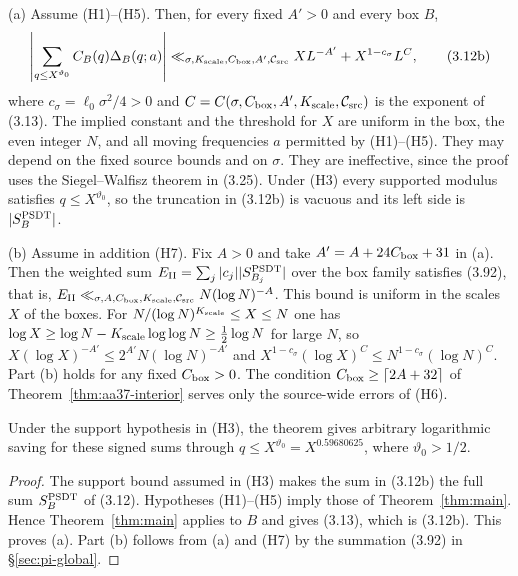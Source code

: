 \begin{theorem}\label{thm:standalone}
\textup{(a)} Assume (H1)--(H5). Then, for every fixed $A'>0$ and
every box $B$,
\[
 \left|\sum_{q\le X^{\vartheta_0}}C_B(q)\Delta_B(q;a)\right|
 \ll_{\sigma,K_{\rm scale},C_{\rm box},A',\mathcal C_{\rm src}}
 XL^{-A'}+X^{1-c_\sigma}L^C,
\tag{3.12b}
\]
where $c_\sigma=\ell_0\sigma^2/4>0$ and
$C=C(\sigma,C_{\rm box},A',K_{\rm scale},\mathcal C_{\rm src})$ is the exponent of (3.13).
The implied constant and the threshold for $X$ are uniform in the box,
the even integer $N$, and all moving frequencies $a$ permitted by
(H1)--(H5). They may
depend on the fixed source bounds and on $\sigma$. They are
ineffective, since the proof uses the Siegel--Walfisz theorem in (3.25).
Under (H3) every supported modulus satisfies $q\le X^{\vartheta_0}$, so
the truncation in (3.12b) is vacuous and its left side is $|S_B^{\rm PSDT}|$.

\textup{(b)} Assume in addition (H7). Fix $A>0$ and take
$A'=A+24C_{\rm box}+31$ in \textup{(a)}. Then the weighted sum
$E_{\rm II}=\sum_j|c_j||S_{B_j}^{\rm PSDT}|$ over the box family
satisfies (3.92), that is,
$E_{\rm II}\ll_{\sigma,A,C_{\rm box},K_{\rm scale},\mathcal C_{\rm src}}
N(\log N)^{-A}$.
This bound is uniform in the scales $X$ of the boxes. For
$N/(\log N)^{K_{\rm scale}}\le X\le N$ one has
$\log X\ge\log N-K_{\rm scale}\log\log N\ge\tfrac12\log N$ for large $N$,
so $X(\log X)^{-A'}\le2^{A'}N(\log N)^{-A'}$ and
$X^{1-c_\sigma}(\log X)^C\le N^{1-c_\sigma}(\log N)^C$.
Part \textup{(b)} holds for any fixed $C_{\rm box}>0$. The condition
$C_{\rm box}\ge\lceil2A+32\rceil$ of Theorem~\ref{thm:aa37-interior}
serves only the source-wide errors of (H6).

Under the support hypothesis in (H3), the theorem gives arbitrary
logarithmic saving for these signed sums through
$q\le X^{\vartheta_0}=X^{0.59680625}$, where $\vartheta_0>1/2$.
\end{theorem}

\begin{proof}
The support bound assumed in (H3) makes the sum in (3.12b)
the full sum $S_B^{\rm PSDT}$ of (3.12).
Hypotheses (H1)--(H5) imply those of Theorem~\ref{thm:main}.
Hence Theorem~\ref{thm:main} applies to $B$ and gives (3.13), which is (3.12b).
This proves \textup{(a)}. Part \textup{(b)} follows from \textup{(a)}
and (H7) by the summation (3.92) in \S\ref{sec:pi-global}.
\end{proof}

